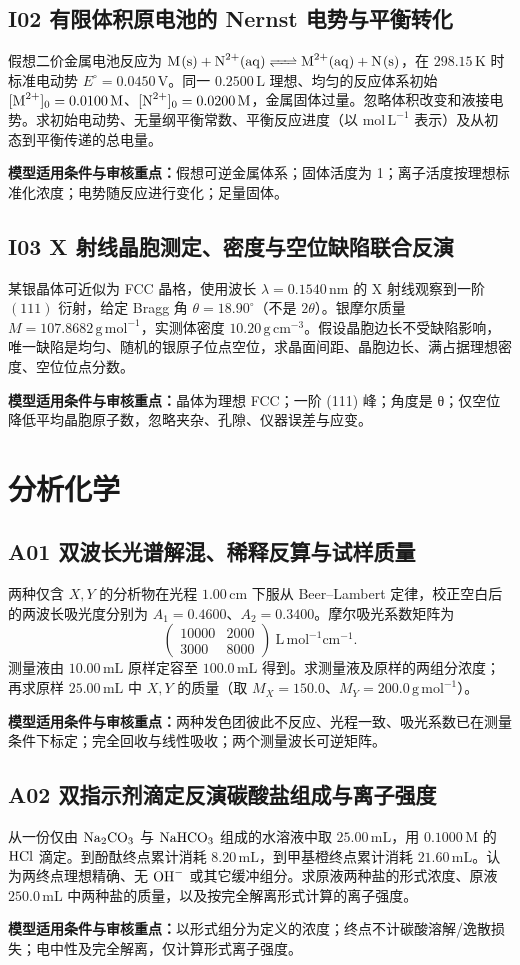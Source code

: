 \documentclass[UTF8,openany,11pt,a4paper]{ctexbook}
\newcommand{\sciencewarn}[1]{\begin{reviewnote}\textbf{\textcolor{warn}{模型适用条件与审核重点：}}#1\end{reviewnote}}
\begin{document}
\section{I02 \quad 有限体积原电池的 Nernst 电势与平衡转化}
假想二价金属电池反应为 \(\ce{M(s) + N^{2+}(aq) <=> M^{2+}(aq) + N(s)}\)，在 \(298.15\,\mathrm K\) 时标准电动势 \(E^\circ=0.0450\,\mathrm V\)。同一 \(0.2500\,\mathrm L\) 理想、均匀的反应体系初始 \([\ce{M^{2+}}]_0=0.0100\,\mathrm M\)、\([\ce{N^{2+}}]_0=0.0200\,\mathrm M\)，金属固体过量。忽略体积改变和液接电势。求初始电动势、无量纲平衡常数、平衡反应进度（以 \(\mathrm{mol\,L^{-1}}\) 表示）及从初态到平衡传递的总电量。
\sciencewarn{假想可逆金属体系；固体活度为 1；离子活度按理想标准化浓度；电势随反应进行变化；足量固体。}
\section{I03 \quad X 射线晶胞测定、密度与空位缺陷联合反演}
某银晶体可近似为 FCC 晶格，使用波长 \(\lambda=0.1540\,\mathrm{nm}\) 的 X 射线观察到一阶 \((111)\) 衍射，给定 Bragg 角 \(\theta=18.90^\circ\)（不是 \(2\theta\)）。银摩尔质量 \(M=107.8682\,\mathrm{g\,mol^{-1}}\)，实测体密度 \(10.20\,\mathrm{g\,cm^{-3}}\)。假设晶胞边长不受缺陷影响，唯一缺陷是均匀、随机的银原子位点空位，求晶面间距、晶胞边长、满占据理想密度、空位位点分数。
\sciencewarn{晶体为理想 FCC；一阶 (111) 峰；角度是 θ；仅空位降低平均晶胞原子数，忽略夹杂、孔隙、仪器误差与应变。}
\chapter{分析化学}
\section{A01 \quad 双波长光谱解混、稀释反算与试样质量}
两种仅含 \(X,Y\) 的分析物在光程 \(1.00\,\mathrm{cm}\) 下服从 Beer--Lambert 定律，校正空白后的两波长吸光度分别为 \(A_1=0.4600\)、\(A_2=0.3400\)。摩尔吸光系数矩阵为
\[
\begin{pmatrix}10000&2000\\3000&8000\end{pmatrix}
\ \mathrm{L\,mol^{-1}cm^{-1}}.
\]
测量液由 \(10.00\,\mathrm{mL}\) 原样定容至 \(100.0\,\mathrm{mL}\) 得到。求测量液及原样的两组分浓度；再求原样 \(25.00\,\mathrm{mL}\) 中 \(X,Y\) 的质量（取 \(M_X=150.0\)、\(M_Y=200.0\,\mathrm{g\,mol^{-1}}\)）。
\sciencewarn{两种发色团彼此不反应、光程一致、吸光系数已在测量条件下标定；完全回收与线性吸收；两个测量波长可逆矩阵。}
\section{A02 \quad 双指示剂滴定反演碳酸盐组成与离子强度}
从一份仅由 \(\ce{Na2CO3}\) 与 \(\ce{NaHCO3}\) 组成的水溶液中取 \(25.00\,\mathrm{mL}\)，用 \(0.1000\,\mathrm M\) 的 \(\ce{HCl}\) 滴定。到酚酞终点累计消耗 \(8.20\,\mathrm{mL}\)，到甲基橙终点累计消耗 \(21.60\,\mathrm{mL}\)。认为两终点理想精确、无 \(\ce{OH-}\) 或其它缓冲组分。求原液两种盐的形式浓度、原液 \(250.0\,\mathrm{mL}\) 中两种盐的质量，以及按完全解离形式计算的离子强度。
\sciencewarn{以形式组分为定义的浓度；终点不计碳酸溶解/逸散损失；电中性及完全解离，仅计算形式离子强度。}
\end{document}
